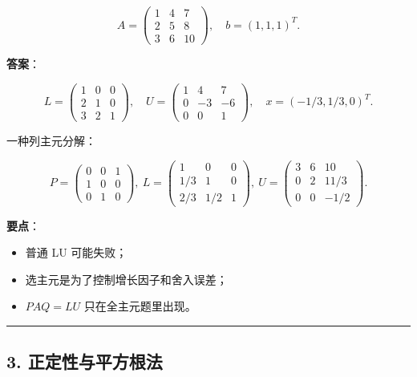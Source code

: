 \documentclass[11pt,a4paper]{ctexart}
\begin{document}
\[
A=\begin{pmatrix}1&4&7\\2&5&8\\3&6&10\end{pmatrix},\quad b=(1,1,1)^T.
\]

\textbf{答案}：

\[
L=\begin{pmatrix}1&0&0\\2&1&0\\3&2&1\end{pmatrix},\quad
U=\begin{pmatrix}1&4&7\\0&-3&-6\\0&0&1\end{pmatrix},\quad
x=(-1/3,1/3,0)^T.
\]

一种列主元分解：

\[
P=\begin{pmatrix}0&0&1\\1&0&0\\0&1&0\end{pmatrix},\ 
L=\begin{pmatrix}1&0&0\\1/3&1&0\\2/3&1/2&1\end{pmatrix},\ 
U=\begin{pmatrix}3&6&10\\0&2&11/3\\0&0&-1/2\end{pmatrix}.
\]

\textbf{要点}：

\begin{itemize}

\item 普通 LU 可能失败；

\item 选主元是为了控制增长因子和舍入误差；

\item $PAQ=LU$ 只在全主元题里出现。

\end{itemize}

\bigskip\hrule\bigskip


\subsection*{3. 正定性与平方根法}

\end{document}
